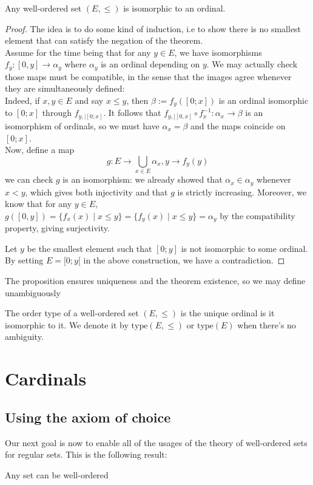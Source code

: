 \documentclass{article}
\begin{document}
\begin{theorem}
    Any well-ordered set $(E, \leq)$ is isomorphic to an ordinal.
\end{theorem}

\begin{proof}
    The idea is to do some kind of induction, i.e to show there is no smallest element that can satisfy the negation of the theorem.\\
    
    Assume for the time being that for any $y \in E$, we have isomorphisms $f_y: [0, y] \to \alpha_y$ where $\alpha_y$ is an ordinal depending on $y$. We may actually check those maps must be compatible, in the sense that the images agree whenever they are simultaneously defined:\\
    Indeed, if $x, y \in E$ and say $x \leq y$, then $\beta := f_y([0;x])$ is an ordinal isomorphic to $[0;x]$ through $f_{y, |[0;x]}$. It follows that $f_{y, |[0, x]} \circ f_x^{-1}: \alpha_x \to \beta$ is an isomorphism of ordinals, so we must have $\alpha_x = \beta$ and the maps coincide on $[0;x]$.\\
    
    Now, define a map $$g: E \to \bigcup_{x \in E}{\alpha_x}, y \to f_y(y)$$ we can check $g$ is an isomorphism: we already showed that $\alpha_x \in \alpha_y$ whenever $x < y$, which gives both injectivity and that $g$ is strictly increasing. Moreover, we know that for any $y \in E$, $g([0,y]) = \{f_x(x) \mid x \leq y \} = \{f_y(x) \mid x \leq y\} = \alpha_y$ by the compatibility property, giving surjectivity.
    
    Let $y$ be the smallest element such that $[0; y]$ is not isomorphic to some ordinal. By setting $E = [0; y[$ in the above construction, we have a contradiction.
\end{proof}

The proposition ensures uniqueness and the theorem existence, so we may define unambiguously
\begin{definition}
    The order type of a well-ordered set $(E, \leq)$ is the unique ordinal is it isomorphic to it. We denote it by $\mathrm{type}(E, \leq)$ or $\mathrm{type}(E)$ when there's no ambiguity.
\end{definition}

\section{Cardinals}


\subsection{Using the axiom of choice}
Our next goal is now to enable all of the usages of the theory of well-ordered sets for regular sets. This is the following result:
\begin{theorem}
    Any set can be well-ordered
\end{theorem}
\end{document}
